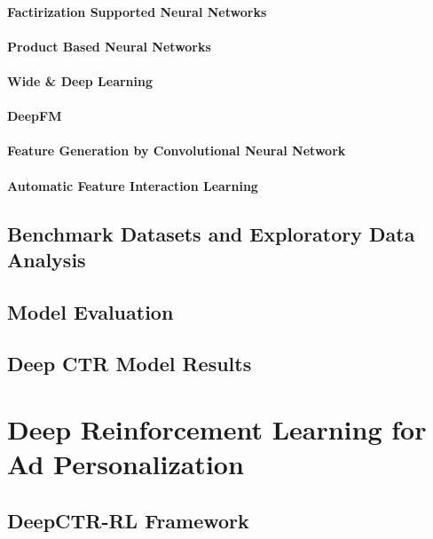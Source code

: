 \documentclass{mldsmsc}
\begin{document}
\subsubsection{Factirization Supported Neural Networks}

\subsubsection{Product Based Neural Networks}

\subsubsection{Wide \& Deep Learning}

\subsubsection{DeepFM}

\subsubsection{Feature Generation by Convolutional Neural Network}

\subsubsection{Automatic Feature Interaction Learning}

\section{Benchmark Datasets and Exploratory Data Analysis}

\section{Model Evaluation}

\section{Deep CTR Model Results}

\chapter{Deep Reinforcement Learning for Ad Personalization}
\label{chap:deep-rl-for-ad-personalization}

\section{DeepCTR-RL Framework}
\end{document}
